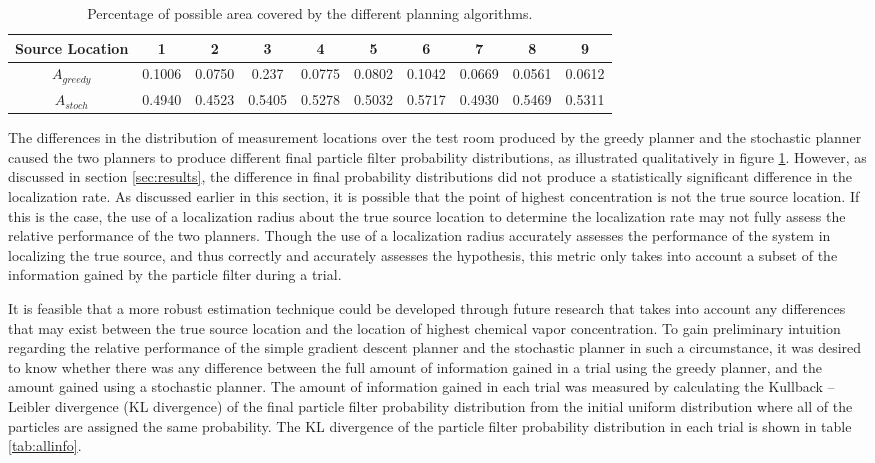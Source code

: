 \documentclass[submit, 12pt]{aiaa-pretty-modified}
\begin{document}
\begin{table}[htb]
\begin{center}
\begin{tabular}{|c||c||c||c||c||c||c||c||c||c|}
\hline
 Source Location & 1 & 2 & 3 & 4 & 5 & 6 & 7 & 8 & 9 \\
\hline \hline
$A_{greedy}$ & 0.1006 & 0.0750 & 0.237 & 0.0775 & 0.0802 & 0.1042 & 0.0669 & 0.0561 & 0.0612 \\
\hline
$A_{stoch}$ & 0.4940 & 0.4523 & 0.5405 & 0.5278 & 0.5032 & 0.5717 & 0.4930 & 0.5469 & 0.5311 \\
\hline
\end{tabular}
\caption{Percentage of possible area covered by the different planning algorithms.}
\label{tab:paths}
\end{center}
\end{table}

The differences in the distribution of measurement locations over the test room
produced by the greedy planner and the stochastic planner caused the
two planners
to produce different final particle filter probability distributions,
as illustrated qualitatively in figure \ref{tab:paths}.  However, as
discussed in section \ref{sec:results}, the difference in final
probability distributions did not produce a statistically significant
difference in the localization rate.  As discussed earlier in this
section, it is possible that the point of highest concentration is
not the true source location.  If this is the case, the use of a localization radius about
the true source location
to determine the localization rate may not fully assess the
relative performance of the two planners.  Though the use of a
localization radius accurately
assesses the performance of the system in localizing the true source,
and thus correctly and accurately assesses the hypothesis, this metric only takes
into account a subset of the information gained by the particle filter
during a trial.

It is feasible that a more robust estimation technique could be developed through
future research that takes into account any differences that may exist
between the true source location and the location of highest chemical
vapor concentration.  To gain preliminary intuition regarding the
relative performance of the simple gradient descent planner and the
stochastic planner in such a circumstance, it was desired to know
whether there was any difference between the full amount of information
gained in a trial using the greedy planner, and the amount gained
using a stochastic planner.  The amount of information gained in each
trial was measured by calculating the Kullback – Leibler divergence (KL
divergence) of
the final particle filter probability distribution from the initial
uniform distribution where all of the particles are assigned the same
probability.  The KL divergence of the particle filter probability
distribution in each trial is shown in table \ref{tab:allinfo}.
\end{document}
